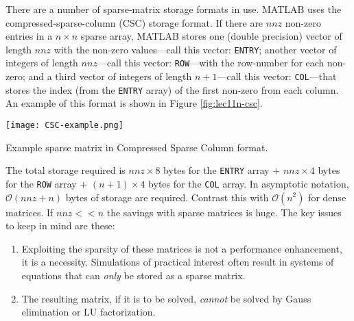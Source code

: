 There are a number of sparse-matrix storage formats in use.  MATLAB uses the compressed-sparse-column (CSC) storage format.\cite{gilbert1992sparse}  If there are $nnz$ non-zero entries in a $n \times n$ sparse array, MATLAB stores one (double precision) vector of length $nnz$ with the non-zero values---call this vector: \lstinline[style=myMatlab]{ENTRY}; another vector of integers of length $nnz$---call this vector: \lstinline[style=myMatlab]{ROW}---with the row-number for each non-zero; and a third vector of integers of length $n+1$---call this vector: \lstinline[style=myMatlab]{COL}---that stores the index (from the \lstinline[style=myMatlab]{ENTRY} array) of the first non-zero from each column.  An example of this format is shown in Figure \ref{fig:lec11n-csc}.  
\begin{marginfigure}
\texttt{[image: CSC-example.png]}
\caption{Example sparse matrix in Compressed Sparse Column format.}
\label{fig:lec11n-csc}
\end{marginfigure} 
\noindent The total storage required is $nnz \times 8$ bytes for the \lstinline[style=myMatlab]{ENTRY} array + $nnz \times 4$ bytes for the \lstinline[style=myMatlab]{ROW} array + $(n+1) \times 4$ bytes for the \lstinline[style=myMatlab]{COL} array.  In asymptotic notation, $\mathcal{O}(nnz+n)$ bytes of storage are required.  Contrast this with $\mathcal{O}(n^2)$ for dense matrices.  If $nnz << n$ the savings with sparse matrices is huge.  The key issues to keep in mind are these:
\begin{enumerate}
\item Exploiting the sparsity of these matrices is not a performance enhancement, it is a necessity.  Simulations of practical interest often result in systems of equations that can \emph{only} be stored as a sparse matrix.
\item The resulting matrix, if it is to be solved, \emph{cannot} be solved by Gauss elimination or LU factorization.
\end{enumerate}

